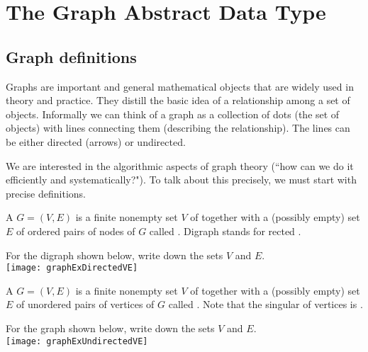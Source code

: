 \part{The Graph Abstract Data Type}
\label{ch:graphadt} 

\chapter{Graph definitions} %
\label{sec:graphdefs}
Graphs are important and general mathematical objects that are widely used in theory and practice. 
They distill the basic idea of a relationship among a set of objects. 
Informally we can think of a graph as a collection of dots (the set of objects) with lines connecting them (describing the relationship). 
The lines can be either directed (arrows) or undirected.

We are interested in the algorithmic aspects of graph theory (``how can we do it efficiently and systematically?").  
To talk about this precisely, we must start with precise definitions.

\begin{Definition}\label{def:digraph} 
A  $G=(V,E)$ is a  finite nonempty set $V$ of  
together with a (possibly empty) set $E$ of ordered pairs of nodes of $G$ called . 
Digraph stands for rected .
\end{Definition}

\begin{Boxample}[0] \label{ex:digraph}
For the digraph shown below, write down the sets $V$ and $E$.\\
\newline 
\texttt{[image: graphExDirectedVE]}
\end{Boxample}

\begin{Definition}\label{def:graph}
A  $G = (V, E)$ is a finite nonempty  set $V$ of 
 together with a (possibly empty) set $E$ of unordered
pairs of vertices of $G$ called . 
Note that the singular of vertices is .
\end{Definition}

\begin{Boxample}[0] \label{ex:graph}
For the graph shown below, write down the sets $V$ and $E$.\\
\newline 
\texttt{[image: graphExUndirectedVE]}
\end{Boxample}

